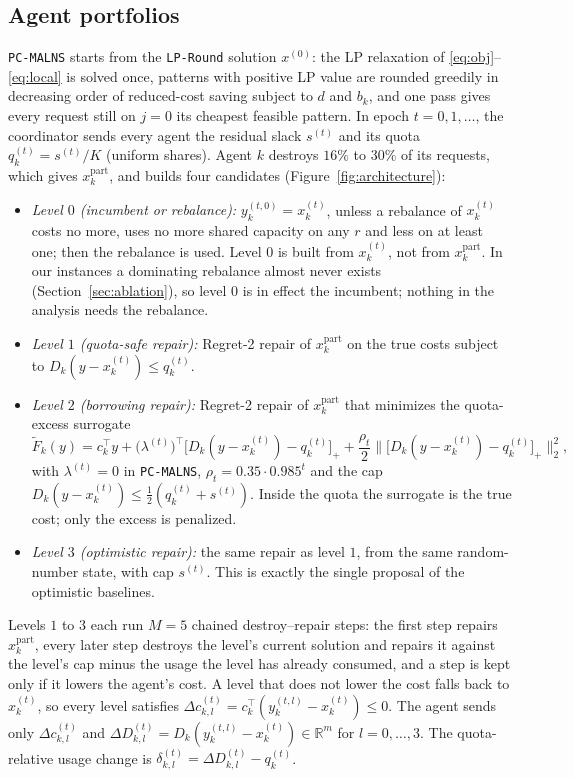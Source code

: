 \documentclass[a4paper,fleqn]{cas-sc}
\newcommand{\pcm}{\texttt{PC-MALNS}}
\begin{document}
\subsection{Agent portfolios}
\label{sec:portfolio}
\pcm{} starts from the \texttt{LP-Round} solution $x^{(0)}$: the LP relaxation of \eqref{eq:obj}--\eqref{eq:local} is solved once, patterns with positive LP value are rounded greedily in decreasing order of reduced-cost saving subject to $d$ and $b_k$, and one pass gives every request still on $j = 0$ its cheapest feasible pattern. In epoch $t = 0, 1, \dots$, the coordinator sends every agent the residual slack $s^{(t)}$ and its quota $q_k^{(t)} = s^{(t)}/K$ (uniform shares). Agent $k$ destroys $16\%$ to $30\%$ of its requests, which gives $x_k^{\text{part}}$, and builds four candidates (Figure~\ref{fig:architecture}):
\begin{itemize}[noitemsep]
    \item \textit{Level $0$ (incumbent or rebalance):} $y_k^{(t,0)} = x_k^{(t)}$, unless a rebalance of $x_k^{(t)}$ costs no more, uses no more shared capacity on any $r$ and less on at least one; then the rebalance is used. Level $0$ is built from $x_k^{(t)}$, not from $x_k^{\text{part}}$. In our instances a dominating rebalance almost never exists (Section~\ref{sec:ablation}), so level $0$ is in effect the incumbent; nothing in the analysis needs the rebalance.
    \item \textit{Level $1$ (quota-safe repair):} Regret-2 repair of $x_k^{\text{part}}$ on the true costs subject to $D_k(y - x_k^{(t)}) \le q_k^{(t)}$.
    \item \textit{Level $2$ (borrowing repair):} Regret-2 repair of $x_k^{\text{part}}$ that minimizes the quota-excess surrogate
    \begin{equation}
        \tilde{F}_k(y) = c_k^\top y + \big(\lambda^{(t)}\big)^\top \big[D_k(y - x_k^{(t)}) - q_k^{(t)}\big]_+ + \frac{\rho_t}{2}\Big\| \big[D_k(y - x_k^{(t)}) - q_k^{(t)}\big]_+ \Big\|_2^2, \label{eq:surrogate}
    \end{equation}
    with $\lambda^{(t)} = 0$ in \pcm, $\rho_t = 0.35 \cdot 0.985^t$ and the cap $D_k(y - x_k^{(t)}) \le \frac12(q_k^{(t)} + s^{(t)})$. Inside the quota the surrogate is the true cost; only the excess is penalized.
    \item \textit{Level $3$ (optimistic repair):} the same repair as level $1$, from the same random-number state, with cap $s^{(t)}$. This is exactly the single proposal of the optimistic baselines.
\end{itemize}
Levels $1$ to $3$ each run $M = 5$ chained destroy--repair steps: the first step repairs $x_k^{\text{part}}$, every later step destroys the level's current solution and repairs it against the level's cap minus the usage the level has already consumed, and a step is kept only if it lowers the agent's cost. A level that does not lower the cost falls back to $x_k^{(t)}$, so every level satisfies $\Delta c_{k,l}^{(t)} = c_k^\top (y_k^{(t,l)} - x_k^{(t)}) \le 0$. The agent sends only $\Delta c_{k,l}^{(t)}$ and $\Delta D_{k,l}^{(t)} = D_k(y_k^{(t,l)} - x_k^{(t)}) \in \mathbb{R}^m$ for $l = 0,\dots,3$. The quota-relative usage change is $\delta_{k,l}^{(t)} = \Delta D_{k,l}^{(t)} - q_k^{(t)}$.
\end{document}
